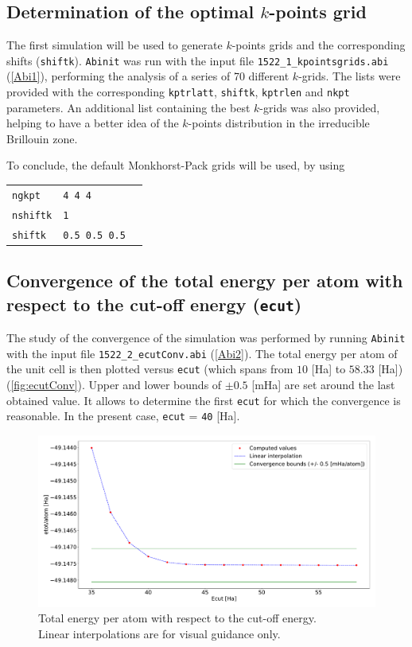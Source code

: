 \documentclass[11pt,a4paper]{article}
\begin{document}
\subsection{Determination of the optimal $k$-points grid}
The first simulation will be used to generate $k$-points grids and the corresponding shifts (\texttt{shiftk}). \texttt{Abinit} was run with the input file \texttt{1522\_1\_kpointsgrids.abi} (\autoref{Abi1}), performing the analysis of a series of 70 different $k$-grids. The lists were provided with the corresponding \texttt{kptrlatt}, \texttt{shiftk}, \texttt{kptrlen} and \texttt{nkpt} parameters. An additional list containing the best $k$-grids was also provided, helping to have a better idea of the $k$-points distribution in the irreducible Brillouin zone.

To conclude, the default Monkhorst-Pack grids will be used, by using
\begin{center}
\begin{tabular}{lll}
\texttt{ngkpt} & \texttt{4 4 4}&\\
\texttt{nshiftk} & \texttt{1} &\\
\texttt{shiftk} &\texttt{0.5 0.5 0.5}
\end{tabular}
\end{center}
\subsection{Convergence of the total energy per atom with respect to the cut-off energy (\texttt{ecut})}
The study of the convergence of the simulation was performed by running \texttt{Abinit} with the input file \texttt{1522\_2\_ecutConv.abi} (\autoref{Abi2}).
The total energy per atom of the unit cell is then plotted versus \texttt{ecut} (which spans from $10$ [Ha] to $58.33$ [Ha]) (\autoref{fig:ecutConv}). Upper and lower bounds of $\pm 0.5$ [mHa] are set around the last obtained value. It allows to determine the first \texttt{ecut} for which the convergence is reasonable. In the present case, \texttt{ecut} = \texttt{40} [Ha].
\begin{figure}[H]
\includegraphics[width=\textwidth]{images/etotecut}
\caption{Total energy per atom with respect to the cut-off energy.\\
Linear interpolations are for visual guidance only.}
\label{fig:ecutConv}
\end{figure}
\end{document}

